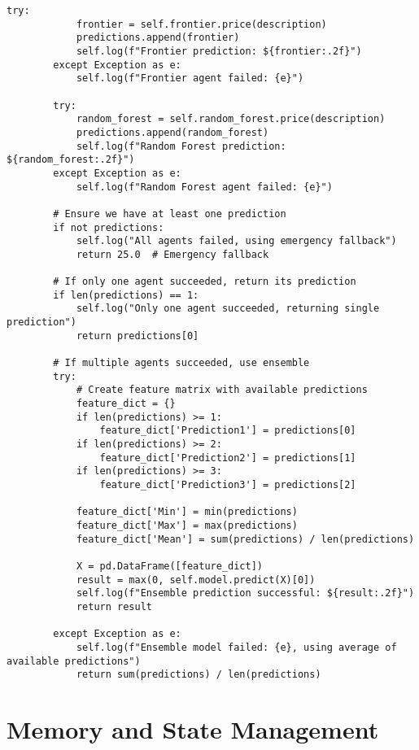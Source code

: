 \begin{lstlisting}[caption=Robust Error Handling Implementation]
        try:
            frontier = self.frontier.price(description)
            predictions.append(frontier)
            self.log(f"Frontier prediction: ${frontier:.2f}")
        except Exception as e:
            self.log(f"Frontier agent failed: {e}")
        
        try:
            random_forest = self.random_forest.price(description)
            predictions.append(random_forest)
            self.log(f"Random Forest prediction: ${random_forest:.2f}")
        except Exception as e:
            self.log(f"Random Forest agent failed: {e}")
        
        # Ensure we have at least one prediction
        if not predictions:
            self.log("All agents failed, using emergency fallback")
            return 25.0  # Emergency fallback
        
        # If only one agent succeeded, return its prediction
        if len(predictions) == 1:
            self.log("Only one agent succeeded, returning single prediction")
            return predictions[0]
        
        # If multiple agents succeeded, use ensemble
        try:
            # Create feature matrix with available predictions
            feature_dict = {}
            if len(predictions) >= 1:
                feature_dict['Prediction1'] = predictions[0]
            if len(predictions) >= 2:
                feature_dict['Prediction2'] = predictions[1]
            if len(predictions) >= 3:
                feature_dict['Prediction3'] = predictions[2]
            
            feature_dict['Min'] = min(predictions)
            feature_dict['Max'] = max(predictions)
            feature_dict['Mean'] = sum(predictions) / len(predictions)
            
            X = pd.DataFrame([feature_dict])
            result = max(0, self.model.predict(X)[0])
            self.log(f"Ensemble prediction successful: ${result:.2f}")
            return result
            
        except Exception as e:
            self.log(f"Ensemble model failed: {e}, using average of available predictions")
            return sum(predictions) / len(predictions)
\end{lstlisting}

\section{Memory and State Management}

